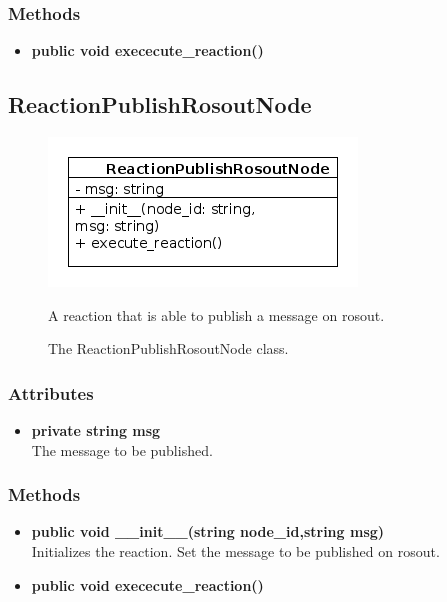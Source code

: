 \subsubsection{Methods}
\begin{itemize}
	\item \textbf{ public void exececute\_reaction() }\\
\end{itemize}

\newpage
\subsection{ReactionPublishRosoutNode}
\begin{figure}[htbp]
	\begin{minipage}[t]{8cm}
		\vspace{0pt}
		\centering
		\includegraphics[scale=0.6]{./diagram_pictures/reactor/ReactionPublishRosoutNode.png}
		\caption{The ReactionPublishRosoutNode class.}
	\end{minipage}
	\hfill
	\begin{minipage}[t]{8cm}
		\vspace{10pt}
			A reaction that is able to publish a message on rosout.
	\end{minipage}
\end{figure}  


\subsubsection{Attributes}
\begin{itemize}
	\item \textbf{ private string msg }\\
		The message to be published.
\end{itemize}
\subsubsection{Methods}
\begin{itemize}
	\item \textbf{ public void \_\_init\_\_(string node\_id,string msg) }\\
		Initializes the reaction. Set the message to be published on rosout.
	\item \textbf{ public void exececute\_reaction() }\\
\end{itemize}


